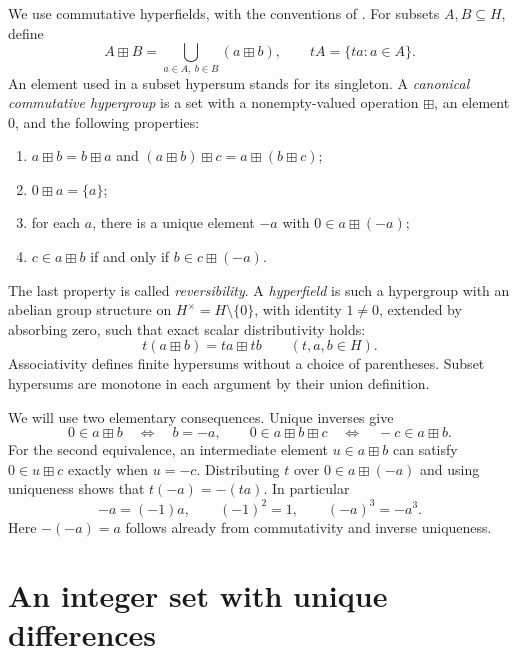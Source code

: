 \documentclass[11pt]{article}
\theoremstyle{remark}
\newcommand{\hs}{\boxplus}
\begin{document}
We use commutative hyperfields, with the conventions of
\cite[Definitions~2.1, 2.4 and 2.8]{BB}.
For subsets $A,B\subseteq H$, define
\[
 A\hs B=\bigcup_{a\in A,\ b\in B}(a\hs b),
 \qquad tA=\{ta:a\in A\}.
\]
An element used in a subset hypersum stands for its singleton.
A \emph{canonical commutative hypergroup} is a set with a nonempty-valued
operation $\hs$, an element $0$, and the following properties:
\begin{enumerate}
\item $a\hs b=b\hs a$ and $(a\hs b)\hs c=a\hs(b\hs c)$;
\item $0\hs a=\{a\}$;
\item for each $a$, there is a unique element $-a$ with $0\in a\hs(-a)$;
\item $c\in a\hs b$ if and only if $b\in c\hs(-a)$.
\end{enumerate}
The last property is called \emph{reversibility}.
A \emph{hyperfield} is such a hypergroup with an abelian group structure
on $H^\times=H\setminus\{0\}$, with identity $1\ne0$, extended by
absorbing zero, such that exact scalar distributivity holds:
\begin{equation}\label{eq:distributivity}
 t(a\hs b)=ta\hs tb\qquad(t,a,b\in H).
\end{equation}
Associativity defines finite hypersums without a choice of parentheses.
Subset hypersums are monotone in each argument by their union definition.

We will use two elementary consequences. Unique inverses give
\begin{equation}\label{eq:zero-test}
 0\in a\hs b\quad\Longleftrightarrow\quad b=-a,
 \qquad
 0\in a\hs b\hs c\quad\Longleftrightarrow\quad -c\in a\hs b.
\end{equation}
For the second equivalence, an intermediate element $u\in a\hs b$
can satisfy $0\in u\hs c$ exactly when $u=-c$.
Distributing $t$ over $0\in a\hs(-a)$ and using uniqueness shows that
$t(-a)=-(ta)$. In particular
\begin{equation}\label{eq:signs}
 -a=(-1)a,\qquad (-1)^2=1,\qquad (-a)^3=-a^3.
\end{equation}
Here $-(-a)=a$ follows already from commutativity and inverse uniqueness.

\section{An integer set with unique differences}\label{sec:differences}
\end{document}
